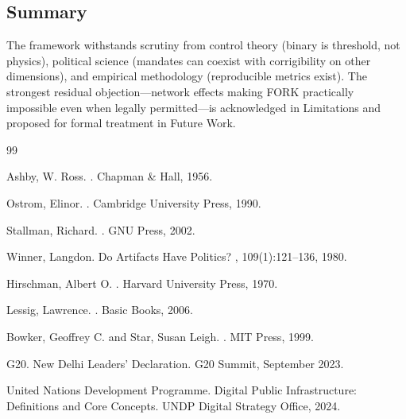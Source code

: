 \documentclass{article}
\begin{document}
\subsection{Summary}

The framework withstands scrutiny from control theory (binary is threshold, not physics), political science (mandates can coexist with corrigibility on other dimensions), and empirical methodology (reproducible metrics exist). The strongest residual objection---network effects making FORK practically impossible even when legally permitted---is acknowledged in Limitations and proposed for formal treatment in Future Work.


\begin{thebibliography}{99}

Ashby, W. Ross.
.
\newblock Chapman \& Hall, 1956.

Ostrom, Elinor.
.
\newblock Cambridge University Press, 1990.

Stallman, Richard.
.
\newblock GNU Press, 2002.

Winner, Langdon.
\newblock Do Artifacts Have Politics?
, 109(1):121--136, 1980.

Hirschman, Albert O.
.
\newblock Harvard University Press, 1970.

Lessig, Lawrence.
.
\newblock Basic Books, 2006.

Bowker, Geoffrey C. and Star, Susan Leigh.
.
\newblock MIT Press, 1999.

G20.
\newblock New Delhi Leaders' Declaration.
\newblock G20 Summit, September 2023.

United Nations Development Programme.
\newblock Digital Public Infrastructure: Definitions and Core Concepts.
\newblock UNDP Digital Strategy Office, 2024.


\end{thebibliography}
\end{document}

